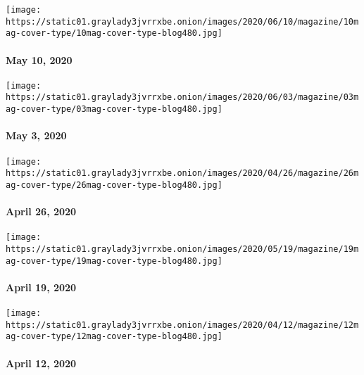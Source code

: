 \href{https://www.nytimes3xbfgragh.onion/issue/magazine/2020/05/07/the-51020-issue}{}

\texttt{[image: https://static01.graylady3jvrrxbe.onion/images/2020/06/10/magazine/10mag-cover-type/10mag-cover-type-blog480.jpg]}

\hypertarget{may-10-2020}{%
\paragraph{May 10, 2020}\label{may-10-2020}}

\href{https://www.nytimes3xbfgragh.onion/issue/magazine/2020/04/30/the-5320-issue}{}

\texttt{[image: https://static01.graylady3jvrrxbe.onion/images/2020/06/03/magazine/03mag-cover-type/03mag-cover-type-blog480.jpg]}

\hypertarget{may-3-2020}{%
\paragraph{May 3, 2020}\label{may-3-2020}}

\href{https://www.nytimes3xbfgragh.onion/issue/magazine/2020/04/23/the-42620-issue}{}

\texttt{[image: https://static01.graylady3jvrrxbe.onion/images/2020/04/26/magazine/26mag-cover-type/26mag-cover-type-blog480.jpg]}

\hypertarget{april-26-2020}{%
\paragraph{April 26, 2020}\label{april-26-2020}}

\href{https://www.nytimes3xbfgragh.onion/issue/magazine/2020/04/17/the-41920-issue}{}

\texttt{[image: https://static01.graylady3jvrrxbe.onion/images/2020/05/19/magazine/19mag-cover-type/19mag-cover-type-blog480.jpg]}

\hypertarget{april-19-2020}{%
\paragraph{April 19, 2020}\label{april-19-2020}}

\href{https://www.nytimes3xbfgragh.onion/issue/magazine/2020/04/10/the-41220-issue}{}

\texttt{[image: https://static01.graylady3jvrrxbe.onion/images/2020/04/12/magazine/12mag-cover-type/12mag-cover-type-blog480.jpg]}

\hypertarget{april-12-2020}{%
\paragraph{April 12, 2020}\label{april-12-2020}}

